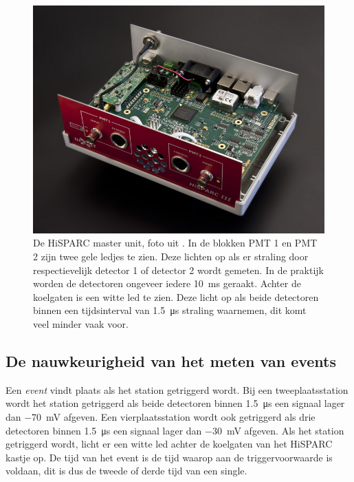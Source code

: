 \begin{figure}[h]
\noindent \begin{centering}
\includegraphics[scale=1.5]{Figures/8cee5cc97a}
\par\end{centering}

\caption{De HiSPARC master unit, foto uit \cite{nikhefhisparc}. In de
         blokken PMT 1 en PMT 2 zijn twee gele ledjes te zien. Deze
         lichten op als er straling door respectievelijk detector 1 of
         detector 2 wordt gemeten. In de praktijk worden de detectoren
         ongeveer iedere \SI{10}{\milli\second} geraakt. Achter de
         koelgaten is een witte led te zien. Deze licht op als beide
         detectoren binnen een tijdsinterval van \SI{1.5}{\micro\second}
         straling waarnemen, dit komt veel minder vaak voor.}
\end{figure}



\subsection{De nauwkeurigheid van het meten van events}

Een \textit{event} vindt plaats als het station getriggerd wordt.
Bij een tweeplaatsstation wordt het station getriggerd als beide detectoren
binnen \SI{1,5}{\micro\second} een signaal lager dan \SI{-70}{\milli\volt}
afgeven. Een vierplaatsstation wordt ook getriggerd als drie detectoren
binnen \SI{1,5}{\micro\second} een signaal lager dan \SI{-30}{\milli\volt}
afgeven. Als het station getriggerd wordt, licht er een witte led
achter de koelgaten van het HiSPARC kastje op. De tijd van het event
is de tijd waarop aan de triggervoorwaarde is voldaan, dit is dus
de tweede of derde tijd van een single.

